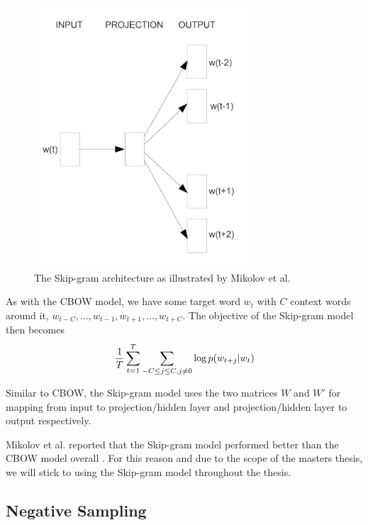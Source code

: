 \begin{figure}[ht]
    \centering
    \includegraphics[width=8cm]{thesis/figures/skip-gram-mikolov-et-al-2013.png}
    \caption{The Skip-gram architecture as illustrated by Mikolov et al. \cite{mikolov2013a}}
    \label{fig:skip-gram-model}
\end{figure}

\noindent
As with the CBOW model, we have some target word $w_t$ with $C$ context words around it, $w_{t-C}, \ldots, w_{t-1}, w_{t+1}, \ldots, w_{t+C}$. The objective of the Skip-gram model \cite{mikolov2013b} then becomes
\begin{align}
    \frac{1}{T} \sum\limits_{t=1}^{T} \sum\limits_{-C \leq j \leq C, j \neq 0}^{} \log  p(w_{t+j} | w_t)
    \label{eqn:skip-gram-objective-function}
\end{align}

\noindent
Similar to CBOW, the Skip-gram model uses the two matrices $W$ and $W'$ for mapping from input to projection/hidden layer and projection/hidden layer to output respectively.

\noindent
Mikolov et al. reported that the Skip-gram model performed better than the CBOW model overall \cite{mikolov2013a}. For this reason and due to the scope of the masters thesis, we will stick to using the Skip-gram model throughout the thesis.

\subsection{Negative Sampling}

